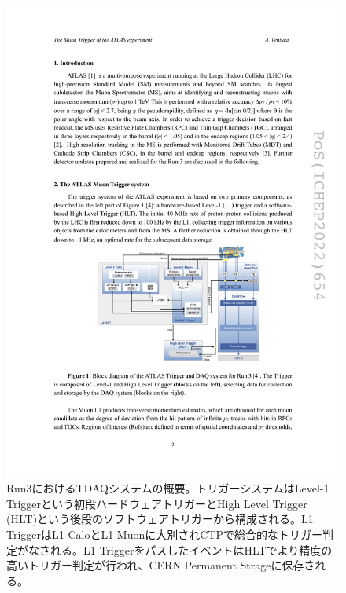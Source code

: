     \begin{figure} 
    \centering
    \includegraphics[width=16cm]{fig/Intro/Run3_TDAQ.pdf}
    \caption[Run3におけるTDAQシステムの概要]{Run3におけるTDAQシステムの概要\cite{Run3_TDAQ}。トリガーシステムはLevel-1 Triggerという初段ハードウェアトリガーとHigh Level Trigger (HLT)という後段のソフトウェアトリガーから構成される。L1 TriggerはL1 CaloとL1 Muonに大別されCTPで総合的なトリガー判定がなされる。L1 TriggerをパスしたイベントはHLTでより精度の高いトリガー判定が行われ、CERN Permanent Strageに保存される。 }
    \label{Run3_TDAQ}
    \end{figure}

